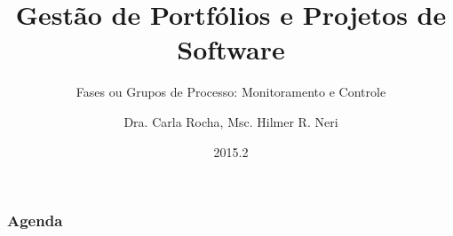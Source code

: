 \documentclass[12pt]{beamer}
\title{Gestão de Portfólios e Projetos de Software}
\subtitle{Fases ou Grupos de Processo: Monitoramento e Controle}
\author{Dra. Carla Rocha, Msc. Hilmer R. Neri}
\institute{Engenharia de Software \\ Universidade de Brasília}
\date{2015.2}
\begin{document}
\frame{\titlepage \vspace{-0.5cm}	
}
\frame
{
\frametitle{Agenda}
\tableofcontents%
}

\end{document}

